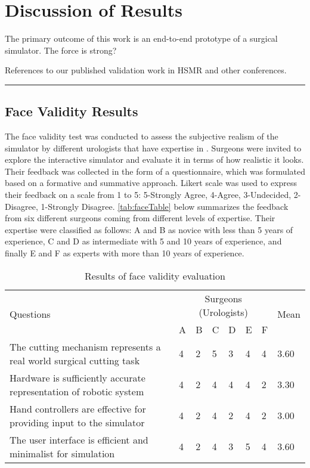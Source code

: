 
\chapter{Discussion of Results}
\label{chp:discussion}

The primary outcome of this work is an end-to-end prototype of a surgical simulator. The force is strong?

References to our published validation work in HSMR and other conferences.

\hrule%

\section{Face Validity Results}
\label{sec:face}
The face validity test was conducted to assess the subjective realism of the simulator by different urologists that have expertise in . Surgeons were invited to explore the interactive simulator and evaluate it in terms of how realistic it looks. Their feedback was collected in the form of a questionnaire, which was formulated based on a formative and summative approach. Likert scale was used to express their feedback on a scale from 1 to 5: 5-Strongly Agree, 4-Agree, 3-Undecided, 2-Disagree, 1-Strongly Disagree.
\autoref{tab:faceTable} below summarizes the feedback from six different surgeons coming from different levels of expertise. Their expertise were classified as follows: A and B as novice with less than 5 years of experience, C and D as intermediate with 5 and 10 years of experience, and finally E and F as experts with more than 10 years of experience.

\begin{table}
\small
\centering
\begin{tabular}{p{6cm}p{0.5cm}p{0.5cm}p{0.5cm}p{0.5cm}p{0.5cm}p{0.5cm}p{0.8cm}}
 \multirow{2}{4em}{Questions} & \multicolumn{6}{c}{Surgeons (Urologists)} & \multirow{2}{4em}{Mean}\\
  \cmidrule{2-7}
  & A & B & C & D & E & F &\\
  \toprule
  The cutting mechanism represents a real world surgical cutting task & 4& 2& 5& 3 & 4& 4 & 3.60\\
  \midrule
  Hardware is sufficiently accurate representation of robotic system
& 4& 2& 4 & 4 & 4 & 2 & 3.30\\
  \midrule
  Hand controllers are effective for providing input to the simulator
& 4 & 2 & 4& 2& 4 & 2 & 3.00\\
  \midrule
  The user interface is efficient and minimalist for simulation  & 4 & 2& 4 & 3 & 5& 4 & 3.60\\
  \bottomrule
\end{tabular}
\caption{Results of face validity evaluation}
\label{tab:faceTable}
\end{table}

